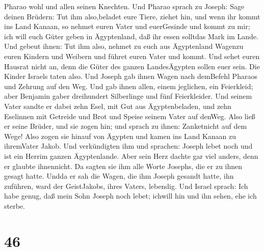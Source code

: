 Pharao wohl und allen seinen Knechten.  Und Pharao sprach
zu Joseph: Sage deinen Brüdern: Tut ihm also,beladet eure Tiere, ziehet
hin,  und wenn ihr kommt ins Land Kanaan, so nehmet euren
Vater und euerGesinde und kommt zu mir; ich will euch Güter geben in
Ägyptenland, daß ihr essen solltdas Mark im Lande.  Und
gebeut ihnen: Tut ihm also, nehmet zu euch aus Ägyptenland Wagenzu euren
Kindern und Weibern und führet euren Vater und kommt.  Und
sehet euren Hausrat nicht an, denn die Güter des ganzen LandesÄgypten
sollen euer sein.  Die Kinder Israels taten also. Und
Joseph gab ihnen Wagen nach demBefehl Pharaos und Zehrung auf den Weg.
 Und gab ihnen allen, einem jeglichen, ein Feierkleid; aber
Benjamin gaber dreihundert Silberlinge und fünf Feierkleider.
 Und seinem Vater sandte er dabei zehn Esel, mit Gut aus
Ägyptenbeladen, und zehn Eselinnen mit Getreide und Brot und Speise
seinem Vater auf denWeg.  Also ließ er seine Brüder, und
sie zogen hin; und sprach zu ihnen: Zanketnicht auf dem Wege!
 Also zogen sie hinauf von Ägypten und kamen ins Land
Kanaan zu ihremVater Jakob.  Und verkündigten ihm und
sprachen: Joseph lebet noch und ist ein Herrim ganzen Ägyptenlande. Aber
sein Herz dachte gar viel anders, denn er glaubte ihnennicht.
 Da sagten sie ihm alle Worte Josephs, die er zu ihnen
gesagt hatte. Undda er sah die Wagen, die ihm Joseph gesandt hatte, ihn
zuführen, ward der GeistJakobs, ihres Vaters, lebendig. 
Und Israel sprach: Ich habe genug, daß mein Sohn Joseph noch lebet;
ichwill hin und ihn sehen, ehe ich sterbe.

\hypertarget{section-45}{%
\section{46}\label{section-45}}

